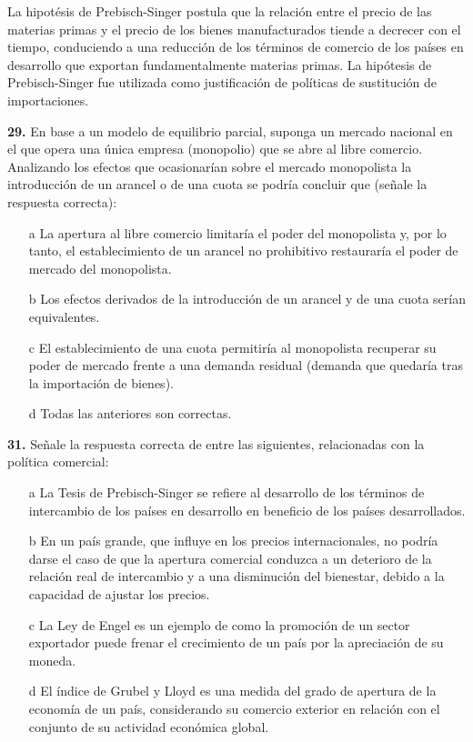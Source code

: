 \documentclass{nuevotema}
\begin{document}
\conceptos


La hipotésis de Prebisch-Singer postula que la relación entre el precio de las materias primas y el precio de los bienes manufacturados tiende a decrecer con el tiempo, conduciendo a una reducción de los términos de comercio de los países en desarrollo que exportan fundamentalmente materias primas. La hipótesis de Prebisch-Singer fue utilizada como justificación de políticas de sustitución de importaciones.

\preguntas


\textbf{29.} En base a un modelo de equilibrio parcial, suponga un mercado nacional en el que opera una única empresa (monopolio) que se abre al libre comercio. Analizando los efectos que ocasionarían sobre el mercado monopolista la introducción de un arancel o de una cuota se podría concluir que (señale la respuesta correcta):

\begin{itemize}
	\item[a] La apertura al libre comercio limitaría el poder del monopolista y, por lo tanto, el establecimiento de un arancel no prohibitivo restauraría el poder de mercado del monopolista.
	\item[b] Los efectos derivados de la introducción de un arancel y de una cuota serían equivalentes.
	\item[c] El establecimiento de una cuota permitiría al monopolista recuperar su poder de mercado frente a una demanda residual (demanda que quedaría tras la importación de bienes).
	\item[d] Todas las anteriores son correctas.
\end{itemize}


\textbf{31.} Señale la respuesta correcta de entre las siguientes, relacionadas con la política comercial:

\begin{itemize}
	\item[a] La Tesis de Prebisch-Singer se refiere al desarrollo de los términos de intercambio de los países en desarrollo en beneficio de los países desarrollados.
	\item[b] En un  país grande, que influye en los precios internacionales, no podría darse el caso de que la apertura comercial conduzca a un deterioro de la relación real de intercambio y a una disminución del bienestar, debido a la capacidad de ajustar los precios.
	\item[c] La Ley de Engel es un ejemplo de como la promoción de un sector exportador puede frenar el crecimiento de un país por la apreciación de su moneda.
	\item[d] El índice de Grubel y Lloyd es una medida del grado de apertura de la economía de un país, considerando su comercio exterior en relación con el conjunto de su actividad económica global.
\end{itemize}
\end{document}

